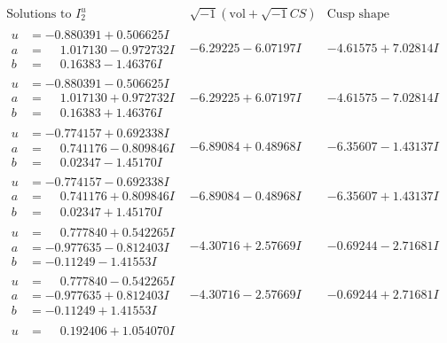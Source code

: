 \documentclass[1p]{elsarticle_modified}
\theoremstyle{definition}
\newcommand{\I}{\sqrt{-1}}
\begin{document}
$$\begin{array}{c|c|c}  
\text{Solutions to }I^u_{2}& \I (\text{vol} + \sqrt{-1}CS) & \text{Cusp shape}\\
 \hline 
\begin{aligned}
u &= -0.880391 + 0.506625 I \\
a &= \phantom{-}1.017130 - 0.972732 I \\
b &= \phantom{-}0.16383 - 1.46376 I\end{aligned}
 & -6.29225 - 6.07197 I & -4.61575 + 7.02814 I \\ \hline\begin{aligned}
u &= -0.880391 - 0.506625 I \\
a &= \phantom{-}1.017130 + 0.972732 I \\
b &= \phantom{-}0.16383 + 1.46376 I\end{aligned}
 & -6.29225 + 6.07197 I & -4.61575 - 7.02814 I \\ \hline\begin{aligned}
u &= -0.774157 + 0.692338 I \\
a &= \phantom{-}0.741176 - 0.809846 I \\
b &= \phantom{-}0.02347 - 1.45170 I\end{aligned}
 & -6.89084 + 0.48968 I & -6.35607 - 1.43137 I \\ \hline\begin{aligned}
u &= -0.774157 - 0.692338 I \\
a &= \phantom{-}0.741176 + 0.809846 I \\
b &= \phantom{-}0.02347 + 1.45170 I\end{aligned}
 & -6.89084 - 0.48968 I & -6.35607 + 1.43137 I \\ \hline\begin{aligned}
u &= \phantom{-}0.777840 + 0.542265 I \\
a &= -0.977635 - 0.812403 I \\
b &= -0.11249 - 1.41553 I\end{aligned}
 & -4.30716 + 2.57669 I & -0.69244 - 2.71681 I \\ \hline\begin{aligned}
u &= \phantom{-}0.777840 - 0.542265 I \\
a &= -0.977635 + 0.812403 I \\
b &= -0.11249 + 1.41553 I\end{aligned}
 & -4.30716 - 2.57669 I & -0.69244 + 2.71681 I \\ \hline\begin{aligned}
u &= \phantom{-}0.192406 + 1.054070 I \\

\end{aligned}
\end{array}$$
\end{document}

